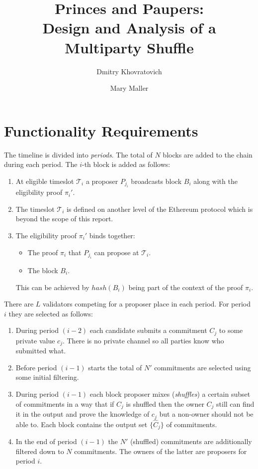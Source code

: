 \documentclass{article}
\title{Princes and Paupers:\\
Design and Analysis of a Multiparty Shuffle}
\author{ Dmitry Khovratovich \and Mary Maller}
\begin{document}
\maketitle

\section{ Functionality Requirements}

The timeline is divided into \emph{periods}. The total of $N$ blocks are added to the chain during each period. The $i$-th block is added as follows:
\begin{enumerate}
    \item At eligible timeslot $\mathcal{T}_i$ a proposer $P_{j_i}$ broadcasts block $B_i$ along with the eligibility proof $\pi_i'$.
    \item The timeslot $\mathcal{T}_i$ is defined on another level of the Ethereum protocol which is beyond the scope of this report.
    \item The eligibility proof $\pi_i'$ binds together:
    \begin{itemize}
        \item The proof $\pi_i$ that $P_{j_i}$ can propose at $\mathcal{T}_i$.
        \item The block $B_i$.
    \end{itemize}
    This can be achieved by $hash(B_i)$ being part of the context of the proof $\pi_i$.
\end{enumerate}

There are $L$ validators competing for a proposer place in each period. For period $i$ they are selected as follows:
\begin{enumerate}
    \item During period $(i-2)$ each candidate submits  a commitment $C_j$ to some private value $c_j$. There is no private channel so all parties know who submitted what.
    \item Before period $(i-1)$ starts the total of $N'$ commitments are selected using some initial filtering.
    \item During period $(i-1)$ each block proposer mixes (\emph{shuffles}) a certain subset of commitments in a way that if $C_j$ is shuffled then the owner $C_j$ still can find it in the output and prove the knowledge of $c_j$ but a non-owner should not be able to. Each block contains the output set $\{\widehat{C}_j\}$ of commitments.
    \item In the end of period $(i-1)$ the $N'$ (shuffled) commitments are additionally filtered down to $N$ commitments. The owners of the latter are  proposers for period $i$.
\end{enumerate}
\end{document}
